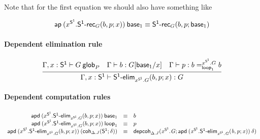 Note that for the first equation we should also have something like
\begin{small}
  \[\mathsf{ap} \: {(x^{\mathsf{S^1}}.\mathsf{S^1\text{-}rec}_G(b, p; x))} \: {\mathsf{base}_{1}}
  \equiv \mathsf{S^1\text{-}rec}_G(b, p; \mathsf{base}_{1})\]
\end{small}

\paragraph{Dependent elimination rule}

\begin{small}
  \[
  \infer{\ofglob{\Gamma,x:\dsd{S^1}}{\dsd{S^1\text{-}elim}_{x^{\dsd{S^1}}.G}(b,
      p; x)}{G}} {\wfglob{\Gamma,x:\dsd{S^1}}{G}{P} &
    \ofglob{\Gamma}{b}{G[\base{1}/x]} &
    \ofglob{\Gamma}{p}{\dhomj{x^{\dsd{S^1}}.G}{b}{b}{\lp{1}}}}
  \]
\end{small}

\paragraph{Dependent computation rules}

\begin{small}
  \[
  \begin{array}{rcl}
    \mathsf{apd} \: {(x^{\mathsf{S^1}}.\mathsf{S^1\text{-}elim}_{x^{\mathsf{S^1}}.G}(b, p; x))} \: {\mathsf{base}_{1}} & \equiv & b \\
    \mathsf{apd} \: {(x^{\mathsf{S^1}}.\mathsf{S^1\text{-}elim}_{x^{\mathsf{S^1}}.G}(b, p; x))} \: {\mathsf{loop}_{1}} & \equiv & p\\
    \mathsf{apd} \: {(x^{\mathsf{S^1}}.\mathsf{S^1\text{-}elim}_{x^{\mathsf{S^1}}.G}(b, p; x))} \: {(\mathsf{coh}_{\Delta.J} \mathit{(\mathsf{S^1};\delta)})} & \equiv &
    \mathsf{depcoh}_{\Delta.J} \mathit{(x^{\mathsf{S^1}}.G;\mathsf{apd} \: {(x^{\mathsf{S^1}}.\mathsf{S^1\text{-}elim}_{x^{\mathsf{S^1}}.G}(b, p; x))} \: {\delta})}
    \\
  \end{array}
  \]
\end{small}


